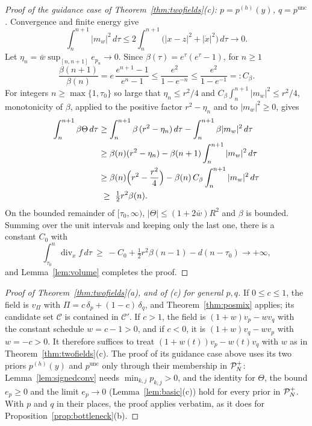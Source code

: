 \documentclass{article} %
\newcommand{\iclrbr}{\\&}\newcommand{\iclrbrq}{\\&\qquad}\newcommand{\iclrqbr}{\\&}
\newcommand{\iclrbr}{}\newcommand{\iclrbrq}{}\newcommand{\iclrqbr}{\qquad}
\theoremstyle{plain}
\theoremstyle{definition}
\theoremstyle{remark}
\begin{document}
\begin{proof}[Proof of the guidance case of Theorem~\ref{thm:twofields}(c): $p=p^{(h)}(y)$, $q=p^{\mathrm{unc}}$]
Convergence and finite energy give
\[
\int_n^{n+1}|m_w|^2\,d\tau\le2\int_n^{n+1}\bigl(|x-z|^2+|\dot x|^2\bigr)\,d\tau\longrightarrow0 .
\]
Let $\eta_n=\bar w\sup_{[n,n+1]}e_{p_u}\to0$. Since $\beta(\tau)=e^\tau(e^\tau-1)$, for $n\ge1$
\[
\frac{\beta(n+1)}{\beta(n)}=e\,\frac{e^{n+1}-1}{e^n-1}\le\frac{e^2}{1-e^{-n}}\le\frac{e^2}{1-e^{-1}}=:C_\beta .
\]
For integers $n\ge\max\{1,\tau_0\}$ so large that $\eta_n\le r^2/4$ and
$C_\beta\int_n^{n+1}|m_w|^2\le r^2/4$, monotonicity of $\beta$, applied to the positive factor
$r^2-\eta_n$ and to $|m_w|^2\ge0$, gives
\begin{align*}
\int_n^{n+1}\beta\Theta\,d\tau
&\ge\int_n^{n+1}\beta\,(r^2-\eta_n)\,d\tau-\int_n^{n+1}\beta|m_w|^2\,d\tau
\iclrbr\ge\beta(n)(r^2-\eta_n)-\beta(n+1)\int_n^{n+1}|m_w|^2\,d\tau\\
&\ge\beta(n)\Bigl(r^2-\frac{r^2}4\Bigr)-\beta(n)\,C_\beta\int_n^{n+1}|m_w|^2\,d\tau
\iclrbr\ \ge\ \tfrac12r^2\beta(n).
\end{align*}
On the bounded remainder of $[\tau_0,\infty)$, $|\Theta|\le(1+2\bar w)R^2$ and $\beta$ is bounded.
Summing over the unit intervals and keeping only the last one, there is a constant $C_0$ with
\[
\int_{\tau_0}^n\operatorname{div}_xf\,d\tau\ \ge\ -C_0+\tfrac12r^2\beta(n-1)-d(n-\tau_0)
\longrightarrow+\infty ,
\]
and Lemma~\ref{lem:volume} completes the proof.
\end{proof}

\label{apx:pf-twofields}
\begin{proof}[Proof of Theorem~\ref{thm:twofields}(a), and of (c) for general $p,q$]
If $0\le c\le1$, the field is $v_\Pi$ with $\Pi=c\,\delta_p+(1-c)\,\delta_q$, and
Theorem~\ref{thm:posmix} applies; its candidate set $\mathcal C$ is contained in $\mathcal C'$. If
$c>1$, the field is $(1+w)v_p-wv_q$ with the constant schedule $w=c-1>0$, and if $c<0$, it is
$(1+w)v_q-wv_p$ with $w=-c>0$. It therefore suffices to treat $(1+w(t))v_p-w(t)v_q$ with $w$ as
in Theorem~\ref{thm:twofields}(c). The proof of its guidance case above uses its two priors $p^{(h)}(y)$ and
$p^{\mathrm{unc}}$ only through their membership in $\mathcal{P}_N^{+}$: Lemma~\ref{lem:signedconv} needs
$\min_{k,j}p_{k,j}>0$, and the identity for $\Theta$, the bound $e_p\ge0$ and the limit
$e_p\to0$ (Lemma~\ref{lem:basic}(c)) hold for every prior in $\mathcal{P}_N^{+}$. With $p$ and $q$ in their
places, the proof applies verbatim, as it does for Proposition~\ref{prop:bottleneck}(b).
\end{proof}

\label{apx:pf-bottleneck}
\end{document}
